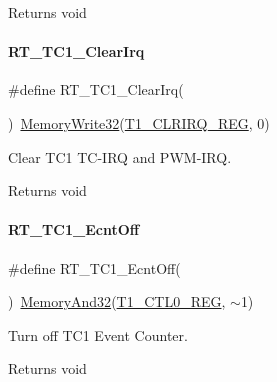 \begin{DoxyReturn}{Returns}
void 
\end{DoxyReturn}
\mbox{\label{a00080_ab9c21242bf3ba2144aa45a336a4dc7ea}} 
\paragraph{\texorpdfstring{R\+T\+\_\+\+T\+C1\+\_\+\+Clear\+Irq}{RT\_TC1\_ClearIrq}}
{\footnotesize\ttfamily \#define R\+T\+\_\+\+T\+C1\+\_\+\+Clear\+Irq(\begin{DoxyParamCaption}{ }\end{DoxyParamCaption})~\mbox{\hyperlink{a00026_a6b9732365b12e48ddb89fe1028b975b0}{Memory\+Write32}}(\mbox{\hyperlink{a00026_a282b05d93f0e94b950d13c1f567dc36d}{T1\+\_\+\+C\+L\+R\+I\+R\+Q\+\_\+\+R\+EG}}, 0)}



Clear T\+C1 T\+C-\/\+I\+RQ and P\+W\+M-\/\+I\+RQ. 

\begin{DoxyReturn}{Returns}
void 
\end{DoxyReturn}
\mbox{\label{a00080_a1c9b9839a03d3e9b1158a2be2feebf42}} 
\paragraph{\texorpdfstring{R\+T\+\_\+\+T\+C1\+\_\+\+Ecnt\+Off}{RT\_TC1\_EcntOff}}
{\footnotesize\ttfamily \#define R\+T\+\_\+\+T\+C1\+\_\+\+Ecnt\+Off(\begin{DoxyParamCaption}{ }\end{DoxyParamCaption})~\mbox{\hyperlink{a00026_ad87cedffcaadc51db22594fce55173d4}{Memory\+And32}}(\mbox{\hyperlink{a00026_a55600694c3c73a1019f78d306f474fa1}{T1\+\_\+\+C\+T\+L0\+\_\+\+R\+EG}}, $\sim$1)}



Turn off T\+C1 Event Counter. 

\begin{DoxyReturn}{Returns}
void 
\end{DoxyReturn}
\mbox{\label{a00080_add9b6f778a744d79226f5165a04a38d9}} 
